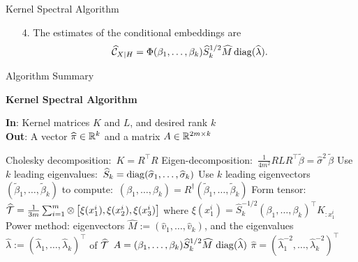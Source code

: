 \documentclass[final,t]{beamer}
\begin{document}
\begin{frame}{}
\begin{columns}[t]
\begin{column}{.3\linewidth}
\begin{block}{Kernel Spectral Algorithm}
\begin{itemize}
      \item[{4.}] The estimates of the conditional embeddings are
      \begin{align*}
        \widehat {\mathcal{C}}_{X|H} = \Phi (\beta_1,\ldots,\beta_k) \widehat  S_k^{1/2} \widehat M \mathop{\mathrm{diag}}(\widehat \lambda).
      \end{align*}
      \end{itemize}
      \vspace{-0.4in}
      \end{block}

      \begin{block}{Algorithm Summary}
          \vspace{-2mm}
          \begin{center}
          \hline
          \hline
          \vspace{2mm}
          \textbf{Kernel Spectral Algorithm}\\
          \hline
          \end{center}
          \textbf{In}: Kernel matrices $K$ and $L$, and desired rank $k$ \\
          \textbf{Out}: A vector $\widehat \pi \in \mathbb{R}^k$ and a matrix $A \in \mathbb{R}^{2m\times k}$\\[-0.4cm]
          \begin{algorithmic}[1]
            \STATE Cholesky decomposition:\ $K=R^\top R$
            \STATE Eigen-decomposition:\ $\frac{1}{4m^2} R L R^\top \widetilde{\beta} = \widehat \sigma^2\,\widetilde{\beta}$
            \STATE Use $k$ leading eigenvalues:\ $\widehat S_k = \mathop{\mathrm{diag}}(\widehat \sigma_1,\ldots,\widehat \sigma_k)$
            \STATE Use $k$ leading eigenvectors $(\widetilde{\beta}_1,\ldots,\widetilde{\beta}_k)$ to
            compute:\ $(\beta_1,\ldots,\beta_k) = R^\dagger (\widetilde{\beta}_1,\ldots,\widetilde{\beta}_k)$
            \STATE Form tensor: $\widehat {{\mathcal{T}}} = \frac{1}{3m}\sum\nolimits_{i=1}^m \otimes\left[\xi(x_1^i), \xi(x_2^i), \xi(x_3^i)\right]$ where $\xi(x_1^i) = \widehat S_k^{-1/2} (\beta_1,\ldots,\beta_k)^\top K_{:x_1^i}$
            \STATE Power method: eigenvectors $\widehat M:=(\widehat v_1,\ldots,\widehat v_k)$, and the eigenvalues $\widehat \lambda := (\widehat\lambda_1,\ldots,\widehat\lambda_k)^\top$ of $\widehat {{\mathcal{T}}}$
            \STATE $A = (\beta_1,\ldots,\beta_k) \widehat  S_k^{1/2} \widehat M \, \mathop{\mathrm{diag}}(\widehat \lambda)$
            \STATE $\widehat \pi = (\widehat\lambda_1^{-2},\ldots,\widehat\lambda_k^{-2})^\top$
          \end{algorithmic}
          \hline
          \vspace{-0.2in}
     \end{block}


\end{column}
\end{columns}
\end{frame}
\end{document}

